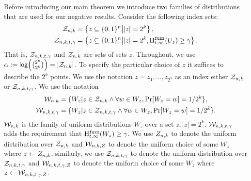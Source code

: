 
\label{sec:family}
Before introducing our main theorem we introduce two families of distributions that are used for our negative results.  Consider the following index sets:
\begin{align*}
\mathcal{Z}_{n,k} &=\left\{z \subseteq \{0, 1\}^n\middle|  |z| = 2^k\right\},\\
\mathcal{Z}_{n,k,t,\gamma} &= \left\{z \subseteq \{0, 1\}^n\middle| |z| = 2^k,\mathrm{H}^{\mathtt{fuzz}}_{t,\infty}(U_z) \ge \gamma\right\}.
\end{align*}
That is, $\mathcal{Z}_{n,k,t,\gamma}$ and $\mathcal{Z}_{n,k}$ are sets of sets $z$.  Throughout, we use $\alpha:= \mathsf{log}\!\left({2^n\choose 2^k}\right) = |\mathcal{Z}_{n,k}|$. To specify the particular choice of $z$ it suffices to describe the $2^k$ points.  We use the notation $z = z_{1},..., z_{2^k}$ as an index either $\mathcal{Z}_{n,k}$ or $\mathcal{Z}_{n,k,t,\gamma}$.
We use the notation 
\begin{align*}
\mathcal{W}_{n,k} &=\{W_z | z \in \mathcal{Z}_{n,k}  \wedge \forall w \in W_z, \Pr[W_z=w]=1/2^k\},\\
\mathcal{W}_{n,k,t,\gamma} &= \{W_z | z\in \mathcal{Z}_{n,k,t,\gamma} \wedge \forall w \in W_z, \Pr[W_z=w]=1/2^k\}.
\end{align*}
$\mathcal{W}_{n,k}$ is the family of uniform distributions $W_z$ over a set $z, |z|=2^k$.
$\mathcal{W}_{n,k,t,\gamma}$ adds the requirement that $\mathrm{H}^{\mathtt{fuzz}}_{t,\infty}(W_z)\ge\gamma$. We use $Z_{n,k}$ to denote the uniform distribution over $\mathcal{Z}_{n,k}$ and $\mathcal{W}_{n,k, Z}$ to denote the uniform choice of some $W_z$ where $z\leftarrow Z_{n,k}$, similarly, we use $\mathcal{Z}_{n,k,t,\gamma}$ to denote the uniform distribution over $\mathcal{Z}_{n,k,t,\gamma}$ and $\mathcal{W}_{n,k,t,\gamma, Z}$ to denote the uniform choice of some $W_z$ where $z\leftarrow \mathcal{W}_{n,k,t,\gamma, Z}$.